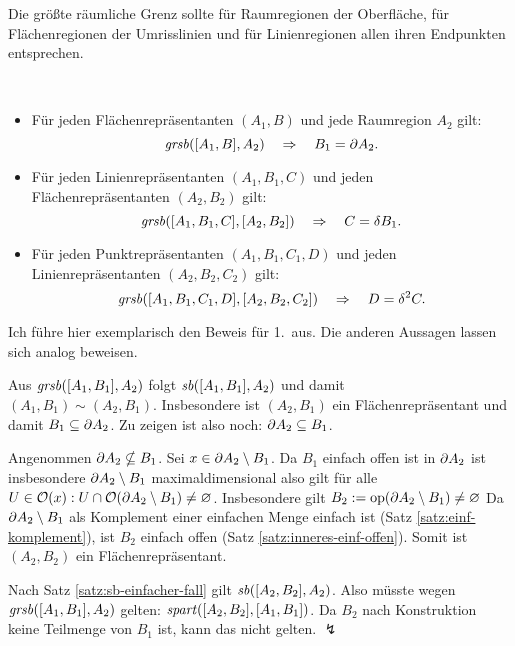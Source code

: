     Die größte räumliche Grenz sollte für Raumregionen der Oberfläche, für Flächenregionen der Umrisslinien und für Linienregionen allen ihren Endpunkten entsprechen.
    \begin{satz}[$\Ggrsb$]\ \vspace{0pt} 

        \begin{itemize}
            \item Für jeden Flächenrepräsentanten $(A_1,B)$ und jede Raumregion $A_2$ gilt:
                $$\mathit{gr\hspace*{-0.25ex}sb}([A_1,B],A_2) \quad \Rightarrow \quad B_1 = \partial A_2.$$
            \item Für jeden Linienrepräsentanten $(A_1,B_1,C)$ und jeden Flächenrepräsentanten $(A_2,B_2)$ gilt:
                $$\mathit{gr\hspace*{-0.25ex}sb}([A_1,B_1,C],[A_2,B_2]) \quad \Rightarrow \quad C = \delta B_1.$$
            \item Für jeden Punktrepräsentanten $(A_1,B_1,C_1,D)$ und jeden Linienrepräsentanten $(A_2,B_2,C_2)$ gilt:
                $$\mathit{gr\hspace*{-0.25ex}sb}([A_1,B_1,C_1,D],[A_2,B_2,C_2]) \quad \Rightarrow \quad D = \delta^2 C.$$
        \end{itemize}

    \end{satz}
    Ich führe hier exemplarisch den Beweis für 1.\ aus. 
    Die anderen Aussagen lassen sich analog beweisen.
    \begin{bew}
        Aus $\mathit{gr\hspace*{-0.25ex}sb}([A_1,B_1],A_2)$ folgt $\mathit{sb}([A_1,B_1],A_2)$ und damit\\
        $(A_1,B_1) \sim (A_2,B_1)$.
        Insbesondere ist $(A_2,B_1)$ ein Flächenrepräsentant und damit $B_1 \subseteq \partial A_2$.
        Zu zeigen ist also noch: $\partial A_2 \subseteq B_1$.

        Angenommen $\partial A_2 \nsubseteq B_1$.
        Sei $x \in \partial A_2 \setminus B_1$. 
        Da $B_1$ einfach offen ist in $\partial A_2$ ist insbesondere $\partial A_2 \setminus B_1$ maximaldimensional also gilt für alle $U \in \mathcal{O}(x): U \cap \mathcal{O}(\partial A_2 \setminus B_1) \neq \varnothing$.
        Insbesondere gilt $B_2 := \text{op}(\partial A_2 \setminus B_1) \neq \varnothing$
        Da $\partial A_2 \setminus B_1$ als Komplement einer einfachen Menge einfach ist (Satz \ref{satz:einf-komplement}), ist $B_2$ einfach offen (Satz \ref{satz:inneres-einf-offen}).
        Somit ist $(A_2,B_2)$ ein Flächenrepräsentant.

        Nach Satz \ref{satz:sb-einfacher-fall} gilt $\mathit{sb}([A_2,B_2],A_2)$.
        Also müsste wegen\\
        $\mathit{gr\hspace*{-0.25ex}sb}([A_1,B_1],A_2)$ gelten: $\mathit{spart}([A_2,B_2],[A_1,B_1])$.
        Da $B_2$ nach Konstruktion keine Teilmenge von $B_1$ ist, kann das nicht gelten. $\lightning$
    \end{bew}
